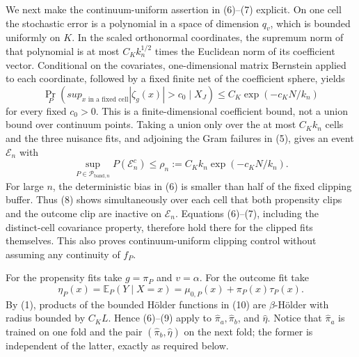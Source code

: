 We next make the continuum-uniform assertion in (6)--(7) explicit.  On one
cell the stochastic error is a polynomial in a space of dimension \(q_v\),
which is bounded uniformly on \(K\).  In the scaled orthonormal coordinates,
the supremum norm of that polynomial is at most \(C_K k_n^{1/2}\) times the
Euclidean norm of its coefficient vector.  Conditional on the covariates,
one-dimensional matrix Bernstein applied to each coordinate, followed by a
fixed finite net of the coefficient sphere, yields
\[
\Pr_P\!\left(sup_{x\text{ in a fixed cell}}|\zeta_g(x)|>c_0
\mid X_J\right)
\le C_K\exp(-c_KN/k_n)
\tag{8}
\]
for every fixed \(c_0>0\).  This is a finite-dimensional coefficient bound,
not a union bound over continuum points.  Taking a union only over the at
most \(C_Kk_n\) cells and the three nuisance fits, and adjoining the Gram
failures in (5), gives an event \(\mathcal E_n\) with
\[
\sup_{P\in\mathcal P_{\mathrm{band},n}}P(\mathcal E_n^c)
\le \rho_n:=C_Kk_n\exp(-c_KN/k_n).
\tag{9}
\]
For large \(n\), the deterministic bias in (6) is smaller than half of the
fixed clipping buffer.  Thus (8) shows simultaneously over each cell that
both propensity clips and the outcome clip are inactive on \(\mathcal E_n\).
Equations (6)--(7), including the distinct-cell covariance property, therefore
hold there for the clipped fits themselves.  This also proves continuum-uniform
clipping control without assuming any continuity of \(f_P\).

For the propensity fits take \(g=\pi_P\) and \(v=\alpha\).  For the outcome
fit take
\[
\eta_P(x)=\mathbb E_P(Y\mid X=x)
=\mu_{0,P}(x)+\pi_P(x)\tau_P(x).
\tag{10}
\]
By (1), products of the bounded H\"older functions in (10) are
\(\beta\)-H\"older with radius bounded by \(C_KL\).  Hence (6)--(9) apply
to \(\widehat\pi_a,\widehat\pi_b\), and \(\widehat\eta\).  Notice that
\(\widehat\pi_a\) is trained on one fold and the pair
\((\widehat\pi_b,\widehat\eta)\) on the next fold; the former is independent
of the latter, exactly as required below.

